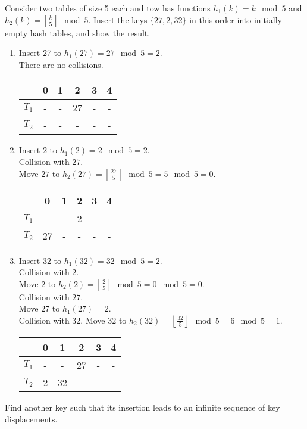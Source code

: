 \documentclass[11pt,a4paper]{article}
\begin{document}
\qpart
Consider two tables of size 5 each and tow has functions $h_1(k)=k\mod5$ and $h_2(k)=\left\lfloor\frac{k}{5}\right\rfloor\mod5$. Insert the keys $\{27,2,32\}$ in this order into initially empty hash tables, and show the result.\\

\apartnb
\begin{enumerate}[label=\arabic*)]
	\item Insert 27 to $h_1(27)=27\mod5=2$.\\
	There are no collisions.\\
	\begin{tabular}{c|ccccc}
		&0&1&2&3&4\\\hline
		$T_1$&-&-&27&-&-\\
		$T_2$&-&-&-&-&-
	\end{tabular}
	\item Insert 2 to $h_1(2)=2\mod5=2$.\\
	Collision with $27$.\\
	Move $27$ to $h_2(27)=\left\lfloor\frac{27}5\right\rfloor\mod5=5\mod5=0$.\\
	\begin{tabular}{c|ccccc}
		&0&1&2&3&4\\\hline
		$T_1$&-&-&2&-&-\\
		$T_2$&27&-&-&-&-
	\end{tabular}
	\item Insert 32 to $h_1(32)=32\mod5=2$.\\
	Collision with $2$.\\
	Move $2$ to $h_2(2)=\left\lfloor\frac{2}5\right\rfloor\mod5=0\mod5=0$.\\
	Collision with $27$.\\
	Move $27$ to $h_1(27)=2$.\\
	Collision with 32.
	Move $32$ to $h_2(32)=\left\lfloor\frac{32}5\right\rfloor\mod5=6\mod5=1$.\\
	\begin{tabular}{c|ccccc}
		&0&1&2&3&4\\\hline
		$T_1$&-&-&27&-&-\\
		$T_2$&2&32&-&-&-
	\end{tabular}
\end{enumerate}

\qpart
Find another key such that its insertion leads to an infinite sequence of key displacements.\\
\end{document}
